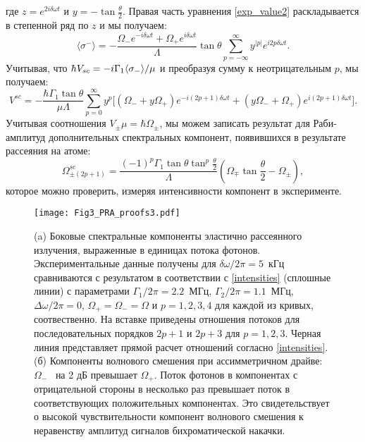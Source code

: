 где %
$z = e^{2i\delta\omega t}$ и $y = -\tan{\frac{\theta}{2}}$. Правая часть уравнения \eqref{exp_value2} раскладывается в степенной ряд по $z$ и мы получаем:
\begin{equation}
\langle\sigma^-\rangle = -\frac{\Omega_- e^{-i\delta\omega t} + \Omega_+ e^{i \delta\omega t}}{\Lambda}\tan\theta \sum_{p=-\infty}^{\infty}y^{|p|} e^{i 2 p \delta\omega t}.
\label{exp_value3}
\end{equation}
Учитывая, что  $\hbar V_{sc} = -i\Gamma_1\!\braket{\sigma_-}\!/\mu$ и преобразуя сумму к неотрицательным $p$, мы получаем:
\begin{equation}
V^{sc} =  
-\frac{\hbar\Gamma_1\tan\theta}{\mu\Lambda}\sum_{p=0}^{\infty}y^p\Big[ (\Omega_- + y \Omega_+ ) e^{-i(2p+1)\delta\omega t}
+ (y \Omega_- + \Omega_+) e^{i(2p+1)\delta\omega t}\Big].
\label{an_eq}
\end{equation}
Учитывая соотношения $V_\pm \mu = \hbar\Omega_\pm$, мы можем записать результат для Раби-амплитуд дополнительных спектральных компонент, появившихся в результате рассеяния на атоме: 
\begin{equation}
\Omega_{\pm(2p+1)}^{sc} =\frac{(-1)^p\Gamma_1\tan\theta\tan^p\frac{\theta}{2}}{\Lambda} (\Omega_{\mp}\tan\frac{\theta}{2} - \Omega_{\pm}),
\label{intensities}
\end{equation} 
которое можно проверить, измеряя интенсивности компонент в эксперименте.

\begin{figure}[thb]
	\centering
	\texttt{[image: Fig3\_PRA\_proofs3.pdf]}
	\caption[Эластичные компоненты: сравнение аналитического расчета и экспериментальных результатов ]{(a) Боковые спектральные компоненты эластично рассеянного излучения, выраженные в единицах потока фотонов. Экспериментальные данные получены для $\delta\omega/2\pi=5$~кГц сравниваются с результатом в соответствии с  \eqref{intensities} (сплошные линии) с параметрами $\Gamma_1/2\pi = 2.2$~МГц, $\Gamma_2/2\pi=1.1$~МГц, $\Delta\omega/2\pi=0$, $\Omega_+=\Omega_- =\Omega$ и $p=1,2,3,4$ для каждой из кривых, соотвественно. На вставке приведены отношения потоков для последовательных порядков $2p+1$ и $2p+3$ для $p=1,2,3$. Черная линия представляет прямой расчет отношений согласно \eqref{intensities}. (б) Компоненты волнового смешения при ассимметричном драйве: $\Omega_-$~ на 2 дБ превышает $\Omega_+ $. Поток фотонов в компонентах с отрицательной стороны в несколько раз превышает поток в соответствующих положительных компонентах. Это свидетельствует о высокой чувствительности компонент волнового смешения к неравенству амплитуд сигналов бихроматической накачки.}
	\label{Peaks_WM_with_fit}
\end{figure}

